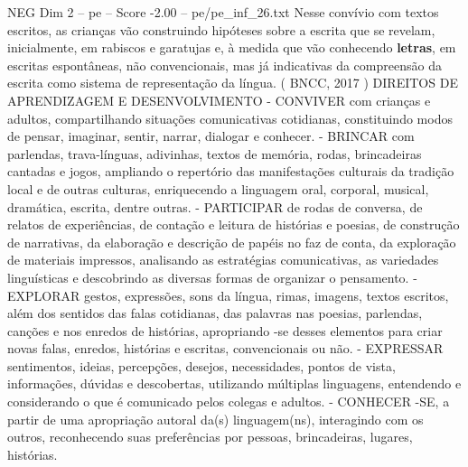 \begin{textsample}{NEG Dim 2 – pe – Score -2.00 – pe/pe\_inf\_26.txt}
Nesse convívio com textos escritos, as crianças vão construindo hipóteses sobre a escrita que se revelam, inicialmente, em rabiscos e garatujas e, à medida que vão conhecendo \textbf{letras}, em escritas espontâneas, não convencionais, mas já indicativas da compreensão da escrita como sistema de representação da língua. ( BNCC, 2017 ) DIREITOS DE APRENDIZAGEM E DESENVOLVIMENTO - CONVIVER com crianças e adultos, compartilhando situações comunicativas cotidianas, constituindo modos de pensar, imaginar, sentir, narrar, dialogar e conhecer. - BRINCAR com parlendas, trava-línguas, adivinhas, textos de memória, rodas, brincadeiras cantadas e jogos, ampliando o repertório das manifestações culturais da tradição local e de outras culturas, enriquecendo a linguagem oral, corporal, musical, dramática, escrita, dentre outras. - PARTICIPAR de rodas de conversa, de relatos de experiências, de contação e leitura de histórias e poesias, de construção de narrativas, da elaboração e descrição de papéis no faz de conta, da exploração de materiais impressos, analisando as estratégias comunicativas, as variedades linguísticas e descobrindo as diversas formas de organizar o pensamento. - EXPLORAR gestos, expressões, sons da língua, rimas, imagens, textos escritos, além dos sentidos das falas cotidianas, das palavras nas poesias, parlendas, canções e nos enredos de histórias, apropriando -se desses elementos para criar novas falas, enredos, histórias e escritas, convencionais ou não. - EXPRESSAR sentimentos, ideias, percepções, desejos, necessidades, pontos de vista, informações, dúvidas e descobertas, utilizando múltiplas linguagens, entendendo e considerando o que é comunicado pelos colegas e adultos. - CONHECER -SE, a partir de uma apropriação autoral da(s) linguagem(ns), interagindo com os outros, reconhecendo suas preferências por pessoas, brincadeiras, lugares, histórias.

\end{textsample}
